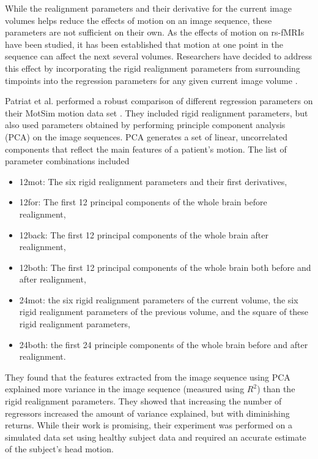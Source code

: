 While the realignment parameters and their derivative for the current image volumes helps reduce the effects of motion on an image sequence, these parameters are not sufficient on their own. As the effects of motion on rs-fMRIs have been studied, it has been established that motion at one point in the sequence can affect the next several volumes. Researchers have decided to address this effect by incorporating the rigid realignment parameters from surrounding timpoints into the regression parameters for any given current image volume \cite{Power2014} \cite{Satterthwaite2013} \cite{Yan2013a}.

Patriat et al. performed a robust comparison of different regression parameters on their MotSim motion data set \cite{Patriat2017}. They included rigid realignment parameters, but also used parameters obtained by performing principle component analysis (PCA) on the image sequences. PCA generates a set of linear, uncorrelated components that reflect the main features of a patient's motion. The list of parameter combinations included 
\begin{itemize}
\item 12mot: The six rigid realignment parameters and their first derivatives,
\item 12for: The first 12 principal components of the whole brain before realignment,
\item 12back: The first 12 principal components of the whole brain after realignment,
\item 12both: The first 12 principal components of the whole brain both before and after realignment,
\item 24mot: the six rigid realignment parameters of the current volume, the six rigid realignment parameters of the previous volume, and the square of these rigid realignment parameters,
\item 24both: the first 24 principle components of the whole brain before and after realignment.
\end{itemize}

\noindent They found that the features extracted from the image sequence using PCA explained more variance in the image sequence (measured using $R^2$) than the rigid realignment parameters. They showed that increasing the number of regressors increased the amount of variance explained, but with diminishing returns. While their work is promising, their experiment was performed on a simulated data set using healthy subject data and required an accurate estimate of the subject's head motion.


